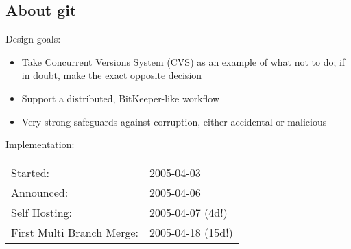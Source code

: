 \subsection{About git}
\begin{frame}
  \subslidetitle
  Design goals:
  \pause
  \begin{itemize}
    \item Take Concurrent Versions System (CVS) as an example of what not to do; if in doubt, make the exact opposite decision
    \pause
    \item Support a distributed, BitKeeper-like workflow
    \pause
    \item Very strong safeguards against corruption, either accidental or malicious
    \pause
  \end{itemize}

  \vspace{2em}
  Implementation:
  \\
  \pause
  \begin{tabular}{ll}
    Started: & 2005-04-03 \\
  \pause
    Announced: &2005-04-06 \\
    \pause
    Self Hosting: & 2005-04-07 (4d!) \\
    \pause
    First Multi Branch Merge: & 2005-04-18 (15d!)
  \end{tabular}

\end{frame}

